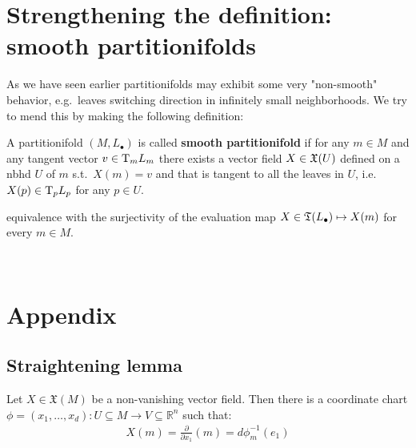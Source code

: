 \section{Strengthening the definition: smooth partitionifolds}

	As we have seen earlier partitionifolds may exhibit some very "non-smooth" behavior, e.g.\ leaves switching direction in infinitely small neighborhoods. We try to mend this by making the following definition:

	\begin{definition}
		A partitionifold $(M, L_\bullet)$ is called \textbf{smooth partitionifold} if for any $m \in M$ and any tangent vector $v \in \mathrm{T}_m L_m$ there exists a vector field $X \in \mathfrak{X}(U)$ defined on a nbhd $U$ of $m$ s.t.\ $X(m) = v$ and that is tangent to all the leaves in $U$, i.e.\ $X(p) \in \mathrm{T}_p L_p$ for any $p \in U$.
	\end{definition}

	\begin{remark}
		equivalence with the surjectivity of the evaluation map $X \in \mathfrak{T}(L_\bullet) \mapsto X(m)$ for every $m \in M$.
	\end{remark}

\newpage
~
\newpage
		

\newpage

\section{Appendix}
        \subsection{Straightening lemma}
        \begin{prop}
            Let $X \in \mathfrak{X}(M)$ be a non-vanishing vector field. Then there is a coordinate chart $\phi = (x_1, \ldots, x_d) : U \subseteq M \to V \subseteq \mathbb{R}^n$ such that:
            \begin{align*}
                X(m) = \frac{\partial}{\partial x_1}(m) = d \phi_m^{-1}(e_1)
            \end{align*}
        \end{prop}
    

